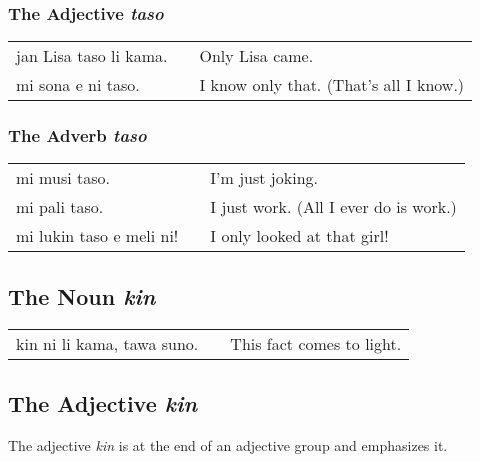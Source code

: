 \subsubsection*{The Adjective \textit{taso}}
%
%
\begin{supertabular}{p{5,5cm}|ll}
    jan Lisa taso li kama. &  & Only Lisa came.                        \\
    mi sona e ni taso.     &  & I know only that. (That's all I know.) \\
\end{supertabular}
%
\subsubsection*{The Adverb \textit{taso}}
%
%
\begin{supertabular}{p{5,5cm}|ll}
    mi musi taso.            &  & I'm just joking.                      \\
    mi pali taso.            &  & I just work. (All I ever do is work.) \\
    mi lukin taso e meli ni! &  & I only looked at that girl!           \\
\end{supertabular}

%
\subsection*{The Noun \textit{kin}}
%
%

\begin{supertabular}{p{5,5cm}|ll}
    kin ni li kama, tawa suno. &  & This fact comes to light. \\
\end{supertabular}

%
\subsection*{The Adjective \textit{kin}}
%
%
The adjective \textit{kin} is at the end of an adjective group and emphasizes it.

